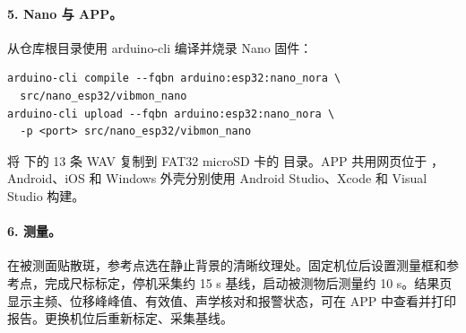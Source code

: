 \paragraph{5. Nano 与 APP。}从仓库根目录使用 arduino-cli 编译并烧录 Nano 固件：
\begin{lstlisting}
arduino-cli compile --fqbn arduino:esp32:nano_nora \
  src/nano_esp32/vibmon_nano
arduino-cli upload --fqbn arduino:esp32:nano_nora \
  -p <port> src/nano_esp32/vibmon_nano
\end{lstlisting}
将  下的 13 条 WAV 复制到 FAT32 microSD 卡的  目录。APP 共用网页位于 ，Android、iOS 和 Windows 外壳分别使用 Android Studio、Xcode 和 Visual Studio 构建。

\paragraph{6. 测量。}在被测面贴散斑，参考点选在静止背景的清晰纹理处。固定机位后设置测量框和参考点，完成尺标标定，停机采集约 15 s 基线，启动被测物后测量约 10 s。结果页显示主频、位移峰峰值、有效值、声学核对和报警状态，可在 APP 中查看并打印报告。更换机位后重新标定、采集基线。

\FloatBarrier

